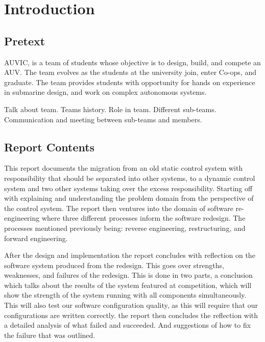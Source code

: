 \chapter{Introduction}

\label{Chapter1}

\section{Pretext}

AUVIC, is a team of students whose objective is to design, build, and compete an
\gls{AUV}.
The team evolves as the students at the university join, enter
Co-ops, and graduate.
The team provides students with opportunity for hands on experience in submarine
design, and work on complex autonomous systems.


Talk about team. Teams history. Role in team. Different sub-teams. Communication and meeting between sub-teams and members.

\section{Report Contents}

This report documents the migration from an old static control system with
responsibility that should be separated into other systems, to a dynamic control
system and two other systems taking over the excess responsibility.
Starting off with explaining and understanding the problem domain from the
perspective of the control system.
The report then ventures into the domain of software re-engineering where three
different processes inform the software redesign.
The processes mentioned previously being: reverse engineering, restructuring,
and forward engineering.

After the design and implementation the report concludes with reflection on the
software system produced from the redesign. This goes over strengths,
weaknesses, and failures of the redesign.
This is done in two parts, a conclusion which talks about the results of the
system featured at competition, which will show the strength of the system
running with all components simultaneously. This will also test our software
configuration quality, as this will require that our configurations are written
correctly.
the report then concludes the reflection with a detailed analysis of what failed
and succeeded. And suggestions of how to fix the failure that was outlined.
